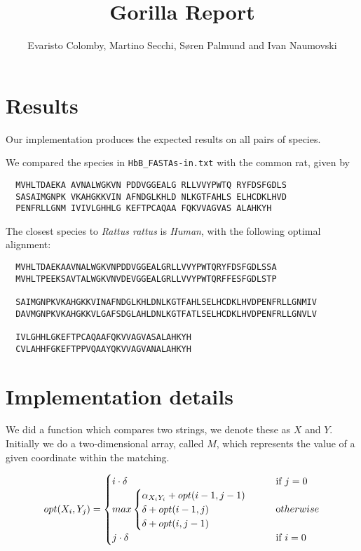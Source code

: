 \documentclass{tufte-handout}
\title{Gorilla Report}
\author{Evaristo Colomby, Martino Secchi, Søren Palmund and Ivan Naumovski}
\begin{document}
  \maketitle

  \section{Results}

  Our implementation produces the expected results on all pairs of species.

  We compared the species in \verb!HbB_FASTAs-in.txt!
  with the common rat, given by

  \begin{verbatim}
  MVHLTDAEKA AVNALWGKVN PDDVGGEALG RLLVVYPWTQ RYFDSFGDLS
  SASAIMGNPK VKAHGKKVIN AFNDGLKHLD NLKGTFAHLS ELHCDKLHVD
  PENFRLLGNM IVIVLGHHLG KEFTPCAQAA FQKVVAGVAS ALAHKYH
  \end{verbatim}


  The closest species to \emph{Rattus rattus} is  \emph{Human}, with the following optimal alignment:

\medskip
  \begin{fullwidth}\small
  \begin{verbatim}
  MVHLTDAEKAAVNALWGKVNPDDVGGEALGRLLVVYPWTQRYFDSFGDLSSA
  MVHLTPEEKSAVTALWGKVNVDEVGGEALGRLLVVYPWTQRFFESFGDLSTP

  SAIMGNPKVKAHGKKVINAFNDGLKHLDNLKGTFAHLSELHCDKLHVDPENFRLLGNMIV
  DAVMGNPKVKAHGKKVLGAFSDGLAHLDNLKGTFATLSELHCDKLHVDPENFRLLGNVLV

  IVLGHHLGKEFTPCAQAAFQKVVAGVASALAHKYH
  CVLAHHFGKEFTPPVQAAYQKVVAGVANALAHKYH
  \end{verbatim}
\end{fullwidth}



  \section{Implementation details}
We did a function which compares two strings, we denote these as $X$ and  $Y$.
Initially we do a two-dimensional array, called $M$, which represents the value of a given coordinate within the matching.

\begin{equation}
    opt(X_i, Y_j) =
    \begin{cases}
    	i\cdot\delta       			& \quad \text{if } j = 0\\
        max 	\begin{cases}
        \alpha_{X_i Y_i} + opt(i-1, j-1)\\
        \delta + opt(i-1, j)\\
        \delta + opt(i, j-1)\\
\end{cases}				& \quad \text otherwise \\
        j\cdot\delta	& \quad \text{if } i = 0  \\
    \end{cases}
\end{equation}\newline
\end{document}
